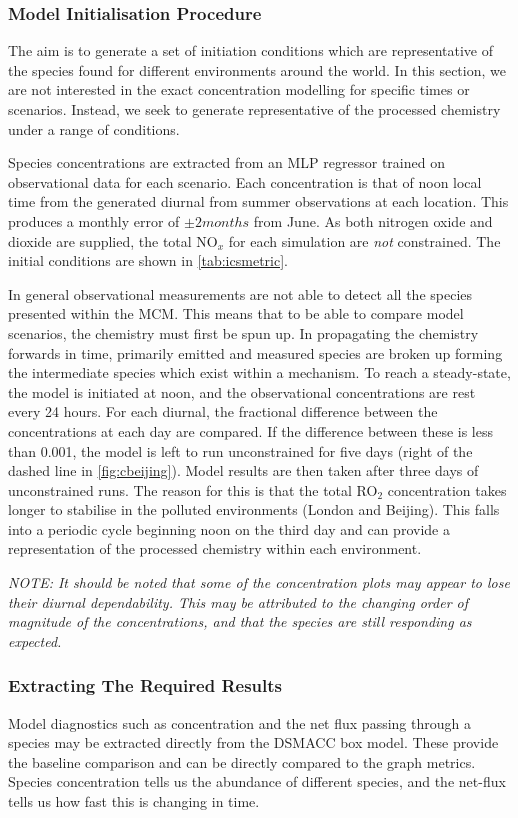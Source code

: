 \subsubsection{Model Initialisation Procedure}
The aim is to generate a set of initiation conditions which are representative of the species found for different environments around the world. In this section, we are not interested in the exact concentration modelling for specific times or scenarios. Instead, we seek to generate representative of the processed chemistry under a range of conditions.

Species concentrations are extracted from an MLP regressor trained on observational data for each scenario. Each concentration is that of noon local time from the generated diurnal from summer observations at each location. This produces a monthly error of $\pm 2 months$ from June. As both nitrogen oxide and dioxide are supplied, the total NO$_x$ for each simulation are \emph{not} constrained. The initial conditions are shown in \autoref{tab:icsmetric}.

In general observational measurements are not able to detect all the species presented within the MCM. This means that to be able to compare model scenarios, the chemistry must first be spun up. In propagating the chemistry forwards in time, primarily emitted and measured species are broken up forming the intermediate species which exist within a mechanism. To reach a steady-state, the model is initiated at noon, and the observational concentrations are rest every 24 hours. For each diurnal, the fractional difference between the concentrations at each day are compared. If the difference between these is less than 0.001, the model is left to run unconstrained for five days (right of the dashed line in \autoref{fig:cbeijing}). Model results are then taken after three days of unconstrained runs. The reason for this is that the total RO$_2$ concentration takes longer to stabilise in the polluted environments (London and Beijing). This falls into a periodic cycle beginning noon on the third day and can provide a representation of the processed chemistry within each environment.

\textit{NOTE: It should be noted that some of the concentration plots may appear to lose their diurnal dependability. This may be attributed to the changing order of magnitude of the concentrations, and that the species are still responding as expected. }

\subsubsection{Extracting The Required Results}
Model diagnostics such as concentration and the net flux passing through a species may be extracted directly from the DSMACC box model. These provide the baseline comparison and can be directly compared to the graph metrics. Species concentration tells us the abundance of different species, and the net-flux tells us how fast this is changing in time.

